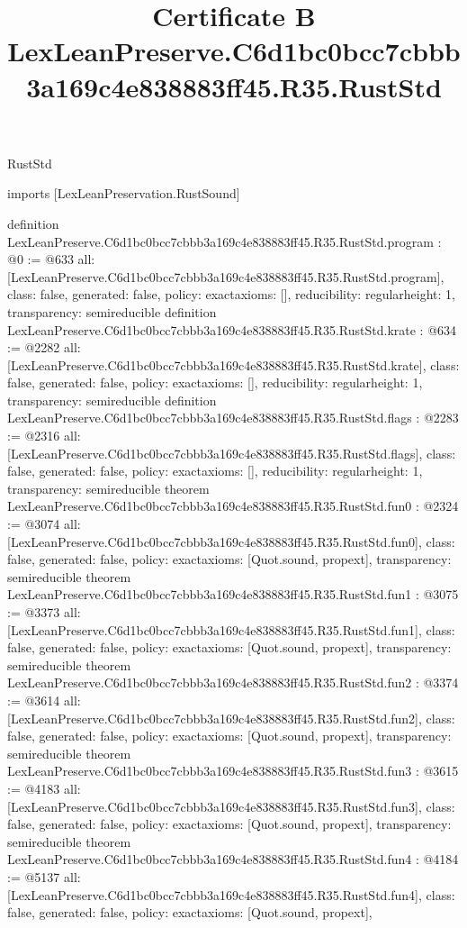 \begin{lexlean}{RustStd}
\title{Certificate B LexLeanPreserve.C6d1bc0bcc7cbbb3a169c4e838883ff45.R35.RustStd}
\begin{coremodule}
imports [LexLeanPreservation.RustSound]

definition LexLeanPreserve.C6d1bc0bcc7cbbb3a169c4e838883ff45.R35.RustStd.program : @0 := @633 {
  all: [LexLeanPreserve.C6d1bc0bcc7cbbb3a169c4e838883ff45.R35.RustStd.program],
  class: false,
  generated: false,
  policy: exact{axioms: []},
  reducibility: regular{height: 1},
  transparency: semireducible
}
definition LexLeanPreserve.C6d1bc0bcc7cbbb3a169c4e838883ff45.R35.RustStd.krate : @634 := @2282 {
  all: [LexLeanPreserve.C6d1bc0bcc7cbbb3a169c4e838883ff45.R35.RustStd.krate],
  class: false,
  generated: false,
  policy: exact{axioms: []},
  reducibility: regular{height: 1},
  transparency: semireducible
}
definition LexLeanPreserve.C6d1bc0bcc7cbbb3a169c4e838883ff45.R35.RustStd.flags : @2283 := @2316 {
  all: [LexLeanPreserve.C6d1bc0bcc7cbbb3a169c4e838883ff45.R35.RustStd.flags],
  class: false,
  generated: false,
  policy: exact{axioms: []},
  reducibility: regular{height: 1},
  transparency: semireducible
}
theorem LexLeanPreserve.C6d1bc0bcc7cbbb3a169c4e838883ff45.R35.RustStd.fun0 : @2324 := @3074 {
  all: [LexLeanPreserve.C6d1bc0bcc7cbbb3a169c4e838883ff45.R35.RustStd.fun0],
  class: false,
  generated: false,
  policy: exact{axioms: [Quot.sound, propext]},
  transparency: semireducible
}
theorem LexLeanPreserve.C6d1bc0bcc7cbbb3a169c4e838883ff45.R35.RustStd.fun1 : @3075 := @3373 {
  all: [LexLeanPreserve.C6d1bc0bcc7cbbb3a169c4e838883ff45.R35.RustStd.fun1],
  class: false,
  generated: false,
  policy: exact{axioms: [Quot.sound, propext]},
  transparency: semireducible
}
theorem LexLeanPreserve.C6d1bc0bcc7cbbb3a169c4e838883ff45.R35.RustStd.fun2 : @3374 := @3614 {
  all: [LexLeanPreserve.C6d1bc0bcc7cbbb3a169c4e838883ff45.R35.RustStd.fun2],
  class: false,
  generated: false,
  policy: exact{axioms: [Quot.sound, propext]},
  transparency: semireducible
}
theorem LexLeanPreserve.C6d1bc0bcc7cbbb3a169c4e838883ff45.R35.RustStd.fun3 : @3615 := @4183 {
  all: [LexLeanPreserve.C6d1bc0bcc7cbbb3a169c4e838883ff45.R35.RustStd.fun3],
  class: false,
  generated: false,
  policy: exact{axioms: [Quot.sound, propext]},
  transparency: semireducible
}
theorem LexLeanPreserve.C6d1bc0bcc7cbbb3a169c4e838883ff45.R35.RustStd.fun4 : @4184 := @5137 {
  all: [LexLeanPreserve.C6d1bc0bcc7cbbb3a169c4e838883ff45.R35.RustStd.fun4],
  class: false,
  generated: false,
  policy: exact{axioms: [Quot.sound, propext]},
}
\end{coremodule}
\end{lexlean}
